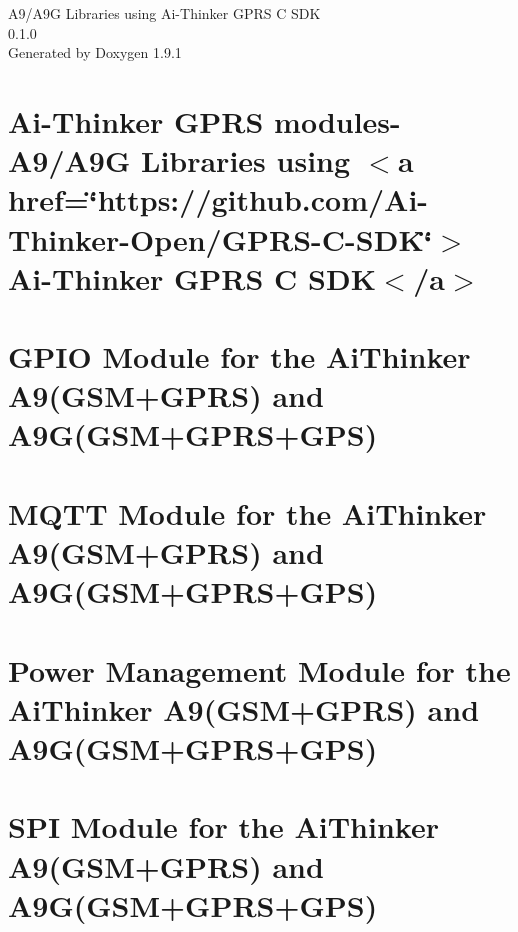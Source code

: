 \let\mypdfximage\pdfximage\def\pdfximage{\immediate\mypdfximage}\documentclass[twoside]{book}
\newcommand{\+}{\discretionary{\mbox{\scriptsize$\hookleftarrow$}}{}{}}
\newcommand{\clearemptydoublepage}{%
  \newpage{\pagestyle{empty}\cleardoublepage}%
}
\begin{document}
\raggedbottom

\hypersetup{pageanchor=false,
             bookmarksnumbered=true,
             pdfencoding=unicode
            }
\begin{titlepage}
\vspace*{7cm}
\begin{center}%
{\Large A9/\+A9G Libraries using Ai-\/\+Thinker GPRS C SDK \\[1ex]\large 0.\+1.\+0 }\\
\vspace*{1cm}
{\large Generated by Doxygen 1.9.1}\\
\end{center}
\end{titlepage}
\clearemptydoublepage
{}
\tableofcontents
\clearemptydoublepage
{}
\hypersetup{pageanchor=true}

\chapter{Ai-\/\+Thinker GPRS modules-\/ A9/\+A9G Libraries using $<$a href=\char`\"{}https\+://github.\+com/\+Ai-\/\+Thinker-\/\+Open/\+GPRS-\/\+C-\/\+SDK\char`\"{}$>$Ai-\/\+Thinker GPRS C SDK$<$/a$>$}
\label{index}\hypertarget{index}{}
\chapter{GPIO Module for the Ai\+Thinker A9(GSM+\+GPRS) and A9G(GSM+\+GPRS+\+GPS)}
\label{md_a9_gpio_lib__r_e_a_d_m_e}

\chapter{MQTT Module for the Ai\+Thinker A9(GSM+\+GPRS) and A9G(GSM+\+GPRS+\+GPS)}
\label{md_a9_mqtt_lib__r_e_a_d_m_e}

\chapter{Power Management Module for the Ai\+Thinker A9(GSM+\+GPRS) and A9G(GSM+\+GPRS+\+GPS)}
\label{md_a9_power_lib__r_e_a_d_m_e}

\chapter{SPI Module for the Ai\+Thinker A9(GSM+\+GPRS) and A9G(GSM+\+GPRS+\+GPS)}
\label{md_a9_spi_lib__r_e_a_d_m_e}

\end{document}
